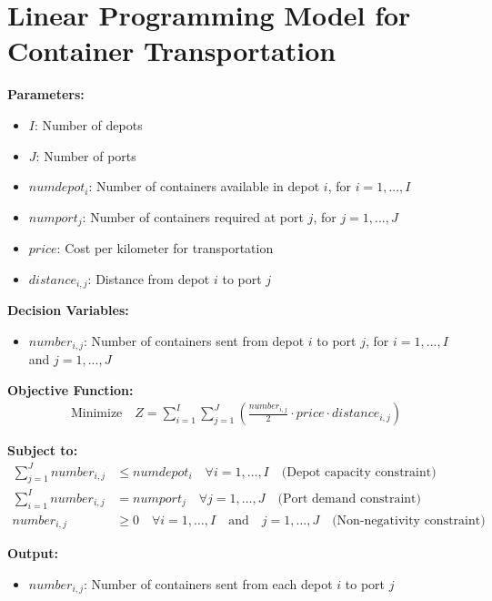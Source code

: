 \documentclass{article}
\begin{document}
\section*{Linear Programming Model for Container Transportation}

\textbf{Parameters:}
\begin{itemize}
    \item $I$: Number of depots
    \item $J$: Number of ports
    \item $numdepot_i$: Number of containers available in depot $i$, for $i = 1,...,I$
    \item $numport_j$: Number of containers required at port $j$, for $j = 1,...,J$
    \item $price$: Cost per kilometer for transportation
    \item $distance_{i,j}$: Distance from depot $i$ to port $j$
\end{itemize}

\textbf{Decision Variables:}
\begin{itemize}
    \item $number_{i,j}$: Number of containers sent from depot $i$ to port $j$, for $i = 1,...,I$ and $j = 1,...,J$
\end{itemize}

\textbf{Objective Function:}
\begin{align*}
\text{Minimize} \quad Z = \sum_{i=1}^{I} \sum_{j=1}^{J} \left( \frac{number_{i,j}}{2} \cdot price \cdot distance_{i,j} \right)
\end{align*}

\textbf{Subject to:}
\begin{align*}
\sum_{j=1}^{J} number_{i,j} & \leq numdepot_i \quad \forall i = 1,\ldots,I \quad \text{(Depot capacity constraint)} \\
\sum_{i=1}^{I} number_{i,j} & = numport_j \quad \forall j = 1,\ldots,J \quad \text{(Port demand constraint)} \\
number_{i,j} & \geq 0 \quad \forall i = 1,\ldots,I \quad \text{and}\quad j = 1,\ldots,J \quad \text{(Non-negativity constraint)} 
\end{align*}

\textbf{Output:}
\begin{itemize}
    \item $number_{i,j}$: Number of containers sent from each depot $i$ to port $j$
\end{itemize}
\end{document}
